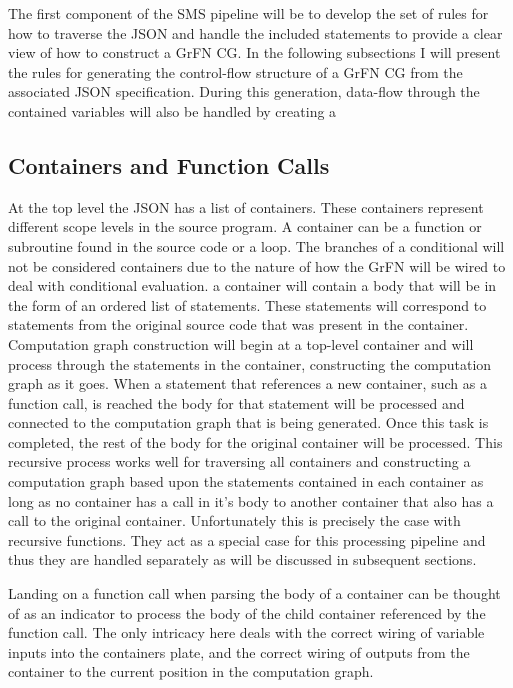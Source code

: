 The first component of the SMS pipeline will be to develop the set of rules for how to traverse the JSON and handle the included statements to provide a clear view of how to construct a GrFN CG.
In the following subsections I will present the rules for generating the control-flow structure of a GrFN CG from the associated JSON specification.
During this generation, data-flow through the contained variables will also be handled by creating a

\subsection{Containers and Function Calls\label{sec:containers}}
At the top level the JSON has a list of containers. These containers represent different scope levels in the source program. A container can be a function or subroutine found in the source code or a loop. The branches of a conditional will not be considered containers due to the nature of how the GrFN will be wired to deal with conditional evaluation. a container will contain a body that will be in the form of an ordered list of statements. These statements will correspond to statements from the original source code that was present in the container. Computation graph construction will begin at a top-level container and will process through the statements in the container, constructing the computation graph as it goes. When a statement that references a new container, such as a function call, is reached the body for that statement will be processed and connected to the computation graph that is being generated. Once this task is completed, the rest of the body for the original container will be processed. This recursive process works well for traversing all containers and constructing a computation graph based upon the statements contained in each container as long as no container has a call in it's body to another container that also has a call to the original container. Unfortunately this is precisely the case with recursive functions. They act as a special case for this processing pipeline and thus they are handled separately as will be discussed in subsequent sections.

Landing on a function call when parsing the body of a container can be thought of as an indicator to process the body of the child container referenced by the function call. The only intricacy here deals with the correct wiring of variable inputs into the containers plate, and the correct wiring of outputs from the container to the current position in the computation graph.

